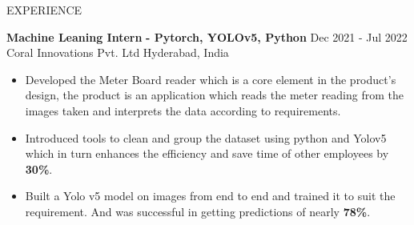 \documentclass{resume} %
\begin{document}
\begin{rSection}{EXPERIENCE}

\textbf{Machine Leaning Intern} \textbf{- Pytorch, YOLOv5, Python} \hfill Dec 2021 - Jul 2022\\
Coral Innovations Pvt. Ltd  \hfill {Hyderabad, India}
 \begin{itemize}
    \itemsep -6pt {} 
     \item Developed the Meter Board reader which is a core element in the product’s design, the product is an application which reads the meter reading from the images taken and interprets the data according to requirements.
     \item Introduced tools to clean and group the dataset using python and Yolov5 which in turn enhances the efficiency and save time of other employees by \textbf{30\%}.
    \item Built a Yolo v5 model on images from end to end and trained it to suit the requirement. And was successful in getting predictions of nearly\textbf{ 78\%}.  
 \end{itemize}


\end{rSection} 

\end{document}
